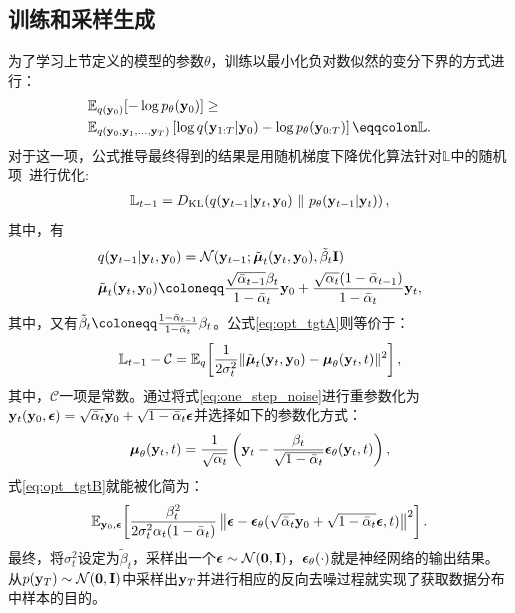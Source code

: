 \subsection{训练和采样生成}
为了学习上节定义的模型的参数$\theta$，训练以最小化负对数似然的变分下界的方式进行：
\begin{equation}
\begin{split}
& \mathbb{E}_{q(\by_0)}[-\log p_\theta(\by_0)] \geq \\
& \mathbb{E}_{q(\by_0, \by_1, \ldots, \by_T)}\left[\log q(\by_{1:T} | \by_0) - \log p_\theta(\by_{0:T})\right] \eqqcolon \mathbb{L}.
\end{split}
\end{equation}
对于这一项，公式推导最终得到的结果是用随机梯度下降优化算法针对$\mathbb{L}$中的随机项~\citep{Ho2020ddpm}进行优化:
\begin{align}
\mathbb{L}_{t-1} = D_{\mathrm{KL}}\!\left(q(\mathbf{y}_{t-1}|\mathbf{y}_t,\mathbf{y}_0) ~ \| ~ p_\theta(\mathbf{y}_{t-1}|\mathbf{y}_t)\right), \label{eq:opt_tgtA}
\end{align}
其中，有
\begin{align}
&q(\by_{t-1}|\by_t,\by_0) = \mathcal{N}(\by_{t-1}; \tilde\bmu_t(\by_t, \by_0), \tilde\beta_t \bI)\\
&\tilde\bmu_t(\by_t, \by_0) \defeq \frac{\sqrt{\bar\alpha_{t-1}}\beta_t }{1-\bar\alpha_t}\by_0 + \frac{\sqrt{\alpha_t}(1- \bar\alpha_{t-1})}{1-\bar\alpha_t} \by_t,
\end{align}
其中，又有$\tilde\beta_t \defeq \frac{1-\bar\alpha_{t-1}}{1-\bar\alpha_t}\beta_t$。公式\eqref{eq:opt_tgtA}则等价于：
\begin{align}
  \mathbb{L}_{t-1} - \mathcal{C}
   = \mathbb{E}_{q}\!\left[ \frac{1}{2\sigma_t^2} \|\tilde{{\boldsymbol{\mu}}}_t(\mathbf{y}_t,\mathbf{y}_0) - {\boldsymbol{\mu}}_\theta(\mathbf{y}_t, t)\|^2 \right], \label{eq:opt_tgtB}
\end{align}
其中，$\mathcal{C}$一项是常数。通过将式\eqref{eq:one_step_noise}进行重参数化为$\mathbf{y}_t(\mathbf{y}_0, {\boldsymbol{\epsilon}}) = \sqrt{\bar\alpha_t}\mathbf{y}_0 + \sqrt{1-\bar\alpha_t}{\boldsymbol{\epsilon}}$并选择如下的参数化方式：
\begin{equation} \label{eq:mu_parameterization}
    {\boldsymbol{\mu}}_\theta(\mathbf{y}_t, t) = \frac{1}{\sqrt{\alpha_t}}\left( \mathbf{y}_t - \frac{\beta_t}{\sqrt{1-\bar\alpha_t}} {\boldsymbol{\epsilon}}_\theta(\mathbf{y}_t, t) \right),
\end{equation}
式\eqref{eq:opt_tgtB}就能被化简为：
\begin{align}
    \mathbb{E}_{\mathbf{y}_0, {\boldsymbol{\epsilon}}}\!\left[ \frac{\beta_t^2}{2\sigma_t^2 \alpha_t (1-\bar\alpha_t)}  \left\| {\boldsymbol{\epsilon}} - {\boldsymbol{\epsilon}}_\theta(\sqrt{\bar\alpha_t} \mathbf{y}_0 + \sqrt{1-\bar\alpha_t}{\boldsymbol{\epsilon}}, t) \right\|^2\right]. \label{eq:opt_tgtC}
\end{align}
最终，将$\sigma_t^2$设定为$\tilde\beta_t$，采样出一个${\boldsymbol{\epsilon}}\sim\mathcal{N}(\mathbf{0},\mathbf{I})$，${\boldsymbol{\epsilon}}_\theta(\cdot)$就是神经网络的输出结果。
从$p(\mathbf{y}_T) \sim \mathcal{N}(\mathbf{0}, \mathbf{I})$中采样出$\mathbf{y}_T$并进行相应的反向去噪过程就实现了获取数据分布中样本的目的。
